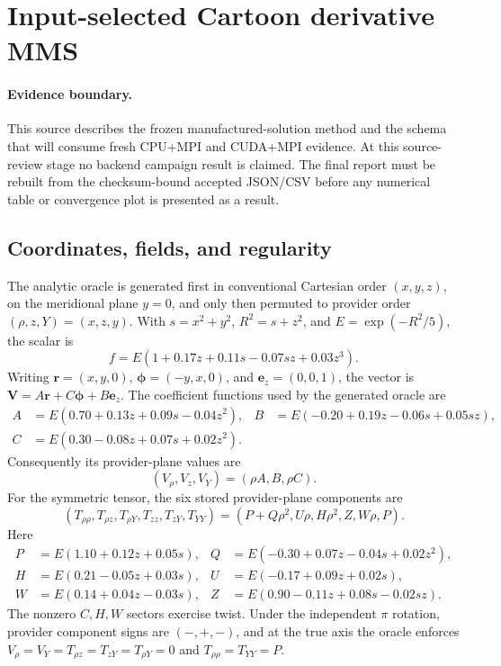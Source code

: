 \section{Input-selected Cartoon derivative MMS}
\label{sec:cartoon-mms}

\paragraph{Evidence boundary.}
This source describes the frozen manufactured-solution method and the schema that
will consume fresh CPU+MPI and CUDA+MPI evidence.  At this source-review stage no
backend campaign result is claimed.  The final report must be rebuilt from the
checksum-bound accepted JSON/CSV before any numerical table or convergence plot is
presented as a result.

\subsection{Coordinates, fields, and regularity}
The analytic oracle is generated first in conventional Cartesian order $(x,y,z)$,
on the meridional plane $y=0$, and only then permuted to provider order
$(\rho,z,Y)=(x,z,y)$.  With $s=x^2+y^2$, $R^2=s+z^2$, and
$E=\exp(-R^2/5)$, the scalar is
\[
 f=E\left(1+0.17z+0.11s-0.07sz+0.03z^3\right).
\]
Writing $\boldsymbol r=(x,y,0)$, $\boldsymbol\phi=(-y,x,0)$, and
$\boldsymbol e_z=(0,0,1)$, the vector is
$\boldsymbol V=A\boldsymbol r+C\boldsymbol\phi+B\boldsymbol e_z$.
The coefficient functions used by the generated oracle are
\begin{align*}
A&=E(0.70+0.13z+0.09s-0.04z^2),&
B&=E(-0.20+0.19z-0.06s+0.05sz),\\
C&=E(0.30-0.08z+0.07s+0.02z^2).
\end{align*}
Consequently its provider-plane values are
\[
 (V_\rho,V_z,V_Y)=(\rho A,B,\rho C).
\]
For the symmetric tensor, the six stored provider-plane components are
\[
 (T_{\rho\rho},T_{\rho z},T_{\rho Y},T_{zz},T_{zY},T_{YY})
 =(P+Q\rho^2,U\rho,H\rho^2,Z,W\rho,P).
\]
Here
\begin{align*}
P&=E(1.10+0.12z+0.05s),&Q&=E(-0.30+0.07z-0.04s+0.02z^2),\\
H&=E(0.21-0.05z+0.03s),&U&=E(-0.17+0.09z+0.02s),\\
W&=E(0.14+0.04z-0.03s),&Z&=E(0.90-0.11z+0.08s-0.02sz).
\end{align*}
The nonzero $C,H,W$ sectors exercise twist.  Under the independent $\pi$ rotation,
provider component signs are $(-,+,-)$, and at the true axis the oracle enforces
$V_\rho=V_Y=T_{\rho z}=T_{zY}=T_{\rho Y}=0$ and
$T_{\rho\rho}=T_{YY}=P$.

